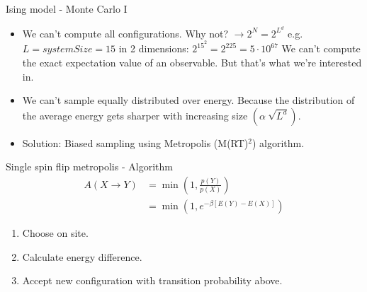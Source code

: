 \documentclass[handout]{beamer}
\begin{document}
\begin{frame}{Ising model - Monte Carlo I}
\begin{itemize}
\item<2-> We can't compute all configurations.
	 {Why not? \( \rightarrow 2^N = 2^{L^d} \) e.g. \( L = systemSize = 15 \) in 2 dimensions: \(2^{15^2} = 2^{225} = 5 \cdot 10^{67}\)}
	 {We can't compute the exact expectation value of an observable. But that's what we're interested in.}
\item<3-> We can't sample equally distributed over energy.
	 {Because the distribution of the average energy gets sharper with increasing size \(\left(\alpha \ \sqrt{L^d}\right)\).}
\item<4-> Solution: Biased sampling using Metropolis (M(RT)$^2$) algorithm.
\end{itemize}
\end{frame}

\begin{frame}{Single spin flip metropolis - Algorithm}
\pause
\begin{align*}
A(X \rightarrow Y) &= \min \left( 1, \frac{p(Y)}{p(X)} \right) \\ 
&= \min \left( 1, e^{- \beta \left[ E(Y)-E(X) \right] } \right)
\end{align*}
\begin{enumerate}
\item Choose on site.
\item Calculate energy difference.
\item Accept new configuration with transition probability above.
\end{enumerate}
\end{frame}
\end{document}
